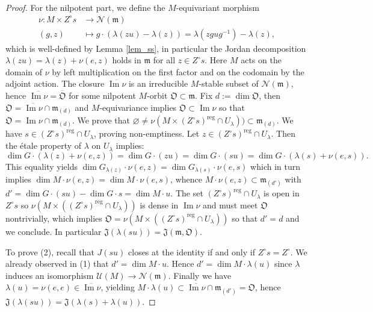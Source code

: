 \documentclass[12pt]{amsart}
\theoremstyle{definition}
\theoremstyle{remark}
\newcommand{\m}{\mathfrak{m}}
\newcommand{\J}{\mathfrak{J}}
\newcommand{\orb}{\mathfrak{O}}
\newcommand{\N}{\mathcal{N}}
\newcommand{\U}{\mathcal{U}}
\newcommand{\image}{\operatorname{Im}}
\newcommand{\reg}{{\operatorname{reg}}}
\begin{document}
\begin{proof}
For the nilpotent part, we define  the $M$-equivariant morphism 
\begin{align*}
\nu \colon M \times Z^\circ s &\to \N(\m) \\
(g, z) & \mapsto g \cdot (\lambda(zu) - \lambda(z)) = \lambda(z gug^{-1}) - \lambda(z),
\end{align*}
which is well-defined by Lemma \ref{lem_ss}, in particular the Jordan decomposition $\lambda(zu) = \lambda(z) + \nu(e,z)$ holds in $\m$ for all $z \in Z^\circ s$.
Here $M$ acts on the domain of $\nu$ by left multiplication on the first factor and on the codomain by the adjoint action.
The closure $\overline{\image \nu}$ is an irreducible $M$-stable subset of $\N(\m)$, hence $\overline{\image \nu} = \overline{\orb}$ for some nilpotent $M$-orbit $\orb \subset \m$.
Fix $d := \dim \orb$, then $\orb = \overline{\image \nu} \cap \m_{(d)}$ and $M$-equivariance implies $\orb \subset \image \nu$ so that $\orb = \image \nu \cap \m_{(d)}$.
We prove that $\varnothing \neq \nu (M \times ( Z^\circ s)^\reg \cap U_\lambda )) \subset \m_{(d)}$.
We  have $s \in (Z^\circ s)^\reg \cap U_\lambda$, proving non-emptiness.
Let $z \in (Z^\circ s)^\reg \cap U_\lambda$.
Then the \'etale property of $\lambda$ on $U_\lambda$ implies: $$\dim G \cdot (\lambda(z) + \nu(e,z)) = \dim G \cdot (zu) = \dim G \cdot (su) = \dim G \cdot (\lambda(s) + \nu(e,s)).$$
This equality yields 
$\dim G_{\lambda(z)} \cdot \nu(e,z) = \dim G_{\lambda(s)} \cdot \nu(e,s)$ which in turn implies
$\dim M \cdot \nu(e,z) = \dim M \cdot \nu (e,s)$, whence
$M \cdot \nu(e,z) \subset \m_{(d')}$
with $d' = \dim G \cdot (su) - \dim G \cdot s = \dim M \cdot u$.
The set $(Z^\circ s)^\reg \cap U_\lambda$ is open in $Z^\circ s$ so $\nu(M \times ((Z^\circ s)^\reg \cap U_\lambda))$ is dense in $\image \nu$ and must meet $\orb$ nontrivially, which implies $\orb = \nu(M \times ((Z^\circ s)^\reg \cap U_\lambda))$ so that $d' = d$ and we conclude.
In particular $\J(\lambda(su)) = \J(\m, \orb)$.

To prove (2), recall that $J(su)$ closes at the identity if and only if $Z^\circ s = Z^\circ$.
We already observed in (1) that $d' = \dim M \cdot u$.
Hence $d' = \dim M \cdot \lambda(u)$ since $\lambda$ induces an isomorphism $\U(M) \to \N(\m)$.
Finally we have $\lambda(u) = \nu(e,e) \in \overline{\image \nu}$, yielding
$M \cdot \lambda(u) \subset \overline{\image \nu} \cap \m_{(d')} = \orb$, hence $\J(\lambda(su)) = \J(\lambda(s) + \lambda(u))$.
\end{proof}
\end{document}
